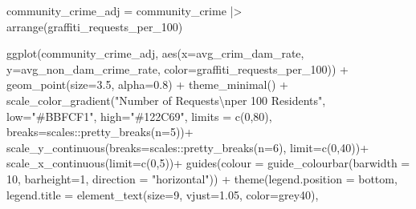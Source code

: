 \documentclass[
]{report}
\newenvironment{Shaded}{}{}
\newcommand{\AttributeTok}[1]{\textcolor[rgb]{0.84,0.23,0.29}{#1}}
\newcommand{\DecValTok}[1]{\textcolor[rgb]{0.00,0.36,0.77}{#1}}
\newcommand{\FloatTok}[1]{\textcolor[rgb]{0.00,0.36,0.77}{#1}}
\newcommand{\FunctionTok}[1]{\textcolor[rgb]{0.44,0.26,0.76}{#1}}
\newcommand{\NormalTok}[1]{\textcolor[rgb]{0.14,0.16,0.18}{#1}}
\newcommand{\OtherTok}[1]{\textcolor[rgb]{0.44,0.26,0.76}{#1}}
\newcommand{\SpecialCharTok}[1]{\textcolor[rgb]{0.00,0.36,0.77}{#1}}
\newcommand{\StringTok}[1]{\textcolor[rgb]{0.01,0.18,0.38}{#1}}
\begin{document}
\begin{Shaded}
\begin{Highlighting}[]
\NormalTok{community\_crime\_adj }\OtherTok{=}\NormalTok{ community\_crime }\SpecialCharTok{|\textgreater{}} 
  \FunctionTok{arrange}\NormalTok{(graffiti\_requests\_per\_100)}

\FunctionTok{ggplot}\NormalTok{(community\_crime\_adj, }\FunctionTok{aes}\NormalTok{(}\AttributeTok{x=}\NormalTok{avg\_crim\_dam\_rate, }\AttributeTok{y=}\NormalTok{avg\_non\_dam\_crime\_rate, }\AttributeTok{color=}\NormalTok{graffiti\_requests\_per\_100)) }\SpecialCharTok{+}
  \FunctionTok{geom\_point}\NormalTok{(}\AttributeTok{size=}\FloatTok{3.5}\NormalTok{, }\AttributeTok{alpha=}\FloatTok{0.8}\NormalTok{) }\SpecialCharTok{+}
  \FunctionTok{theme\_minimal}\NormalTok{() }\SpecialCharTok{+}
  \FunctionTok{scale\_color\_gradient}\NormalTok{(}\StringTok{"Number of Requests}\SpecialCharTok{\textbackslash{}n}\StringTok{per 100 Residents"}\NormalTok{,}
                       \AttributeTok{low=}\StringTok{"\#BBFCF1"}\NormalTok{, }\AttributeTok{high=}\StringTok{"\#122C69"}\NormalTok{,}
                       \AttributeTok{limits =} \FunctionTok{c}\NormalTok{(}\DecValTok{0}\NormalTok{,}\DecValTok{80}\NormalTok{),}
                       \AttributeTok{breaks=}\NormalTok{scales}\SpecialCharTok{::}\FunctionTok{pretty\_breaks}\NormalTok{(}\AttributeTok{n=}\DecValTok{5}\NormalTok{))}\SpecialCharTok{+}
  \FunctionTok{scale\_y\_continuous}\NormalTok{(}\AttributeTok{breaks=}\NormalTok{scales}\SpecialCharTok{::}\FunctionTok{pretty\_breaks}\NormalTok{(}\AttributeTok{n=}\DecValTok{6}\NormalTok{),}
                     \AttributeTok{limit=}\FunctionTok{c}\NormalTok{(}\DecValTok{0}\NormalTok{,}\DecValTok{40}\NormalTok{))}\SpecialCharTok{+}
  \FunctionTok{scale\_x\_continuous}\NormalTok{(}\AttributeTok{limit=}\FunctionTok{c}\NormalTok{(}\DecValTok{0}\NormalTok{,}\DecValTok{5}\NormalTok{))}\SpecialCharTok{+}
  \FunctionTok{guides}\NormalTok{(}\AttributeTok{colour =} \FunctionTok{guide\_colourbar}\NormalTok{(}\AttributeTok{barwidth =} \DecValTok{10}\NormalTok{, }\AttributeTok{barheight=}\DecValTok{1}\NormalTok{, }\AttributeTok{direction =} \StringTok{"horizontal"}\NormalTok{)) }\SpecialCharTok{+}
  \FunctionTok{theme}\NormalTok{(}\AttributeTok{legend.position =} \StringTok{\textquotesingle{}bottom\textquotesingle{}}\NormalTok{,}
        \AttributeTok{legend.title =} \FunctionTok{element\_text}\NormalTok{(}\AttributeTok{size=}\DecValTok{9}\NormalTok{, }\AttributeTok{vjust=}\FloatTok{1.05}\NormalTok{, }\AttributeTok{color=}\StringTok{\textquotesingle{}grey40\textquotesingle{}}\NormalTok{),}

\end{Highlighting}
\end{Shaded}
\end{document}
